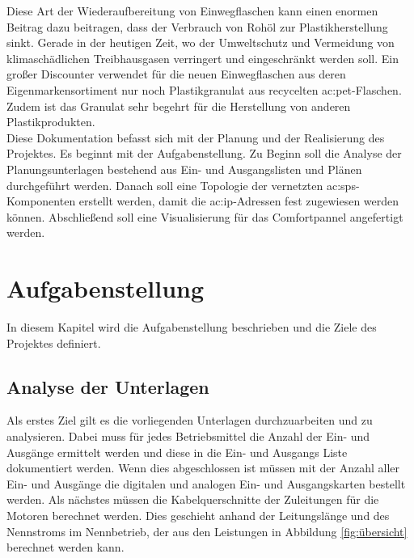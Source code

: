 Diese Art der Wiederaufbereitung von Einwegflaschen kann einen enormen Beitrag dazu beitragen, dass der Verbrauch von Rohöl zur Plastikherstellung sinkt. Gerade in der heutigen Zeit, wo der Umweltschutz und Vermeidung von klimaschädlichen Treibhausgasen verringert und eingeschränkt werden soll. Ein großer Discounter verwendet für die neuen Einwegflaschen aus deren Eigenmarkensortiment nur noch Plastikgranulat aus recycelten \gls{ac:pet}-Flaschen. Zudem ist das Granulat sehr begehrt für die Herstellung von anderen Plastikprodukten. \\
Diese Dokumentation befasst sich mit der Planung und der Realisierung des Projektes. Es beginnt mit der Aufgabenstellung. Zu Beginn soll die Analyse der Planungsunterlagen bestehend aus Ein- und Ausgangslisten und Plänen durchgeführt werden. Danach soll eine Topologie der vernetzten \gls{ac:sps}-Komponenten erstellt werden, damit die \gls{ac:ip}-Adressen fest zugewiesen werden können. Abschließend soll eine Visualisierung für das Comfortpannel angefertigt werden.


\chapter{Aufgabenstellung}

In diesem Kapitel wird die Aufgabenstellung beschrieben und die Ziele des Projektes definiert. 

\section{Analyse der Unterlagen}

Als erstes Ziel gilt es die vorliegenden Unterlagen durchzuarbeiten und zu analysieren. Dabei muss für jedes Betriebsmittel die Anzahl der Ein- und Ausgänge ermittelt werden und diese in die Ein- und Ausgangs Liste dokumentiert werden. Wenn dies abgeschlossen ist müssen mit der Anzahl aller Ein- und Ausgänge die digitalen und analogen Ein- und Ausgangskarten bestellt werden. Als nächstes müssen die Kabelquerschnitte der Zuleitungen für die Motoren berechnet werden. Dies geschieht anhand der Leitungslänge und des Nennstroms im Nennbetrieb, der aus den Leistungen in Abbildung \ref{fig:übersicht} berechnet werden kann. 


